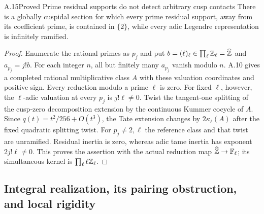 \begin{statement}{A.15}{Proved}
{Prime residual supports do not detect arbitrary cusp contacts}
There is a globally cuspidal section for which every prime residual
support, away from its coefficient prime, is contained in $\{2\}$,
while every adic Legendre representation is infinitely ramified.
\end{statement}
\begin{proof}
Enumerate the rational primes as $p_j$ and put
$b=(\ell)_\ell\in\prod_\ell\mathbb Z_\ell=\widehat{\mathbb Z}$ and
$a_{p_j}=j!b$.  For each integer $n$, all but finitely many $a_{p_j}$
vanish modulo $n$.  A.10 gives a completed rational multiplicative
class $A$ with these valuation coordinates and positive sign.
Every reduction modulo a prime $\ell$ is zero.  For fixed $\ell$,
however, the $\ell$-adic valuation at every $p_j$ is $j!\ell\ne0$.
Twist the tangent-one splitting of the cusp-zero decomposition extension
by the continuous Kummer cocycle of $A$.
Since $q(t)=t^2/256+O(t^3)$, the Tate extension changes by
$2\kappa_\ell(A)$ after the fixed quadratic splitting twist.
For $p_j\ne2,\ell$ the reference class and that twist are unramified.
Residual inertia is zero, whereas adic tame inertia has exponent
$2j!\ell\ne0$.  This proves the assertion with the actual reduction
map $\widehat{\mathbb Z}\to\mathbb F_\ell$; its simultaneous kernel is
$\prod_\ell\ell\mathbb Z_\ell$.
\end{proof}

\subsection{Integral realization, its pairing obstruction, and local rigidity}

